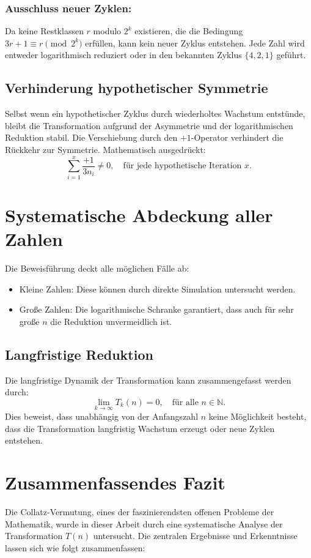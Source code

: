 \documentclass[a4paper,12pt]{article}
\begin{document}
\subsubsection{Ausschluss neuer Zyklen:}
   Da keine Restklassen \( r \) modulo \( 2^k \) existieren, die die Bedingung \( 3r + 1 \equiv r \pmod{2^k} \) erfüllen, kann kein neuer Zyklus entstehen. Jede Zahl wird entweder logarithmisch reduziert oder in den bekannten Zyklus \( \{4, 2, 1\} \) geführt.

\subsection{Verhinderung hypothetischer Symmetrie}
Selbst wenn ein hypothetischer Zyklus durch wiederholtes Wachstum entstünde, bleibt die Transformation aufgrund der Asymmetrie und der logarithmischen Reduktion stabil. Die Verschiebung durch den \(+1\)-Operator verhindert die Rückkehr zur Symmetrie. Mathematisch ausgedrückt:
\[
\sum_{i=1}^x \frac{+1}{3n_i} \neq 0, \quad \text{für jede hypothetische Iteration } x.
\]


\section{Systematische Abdeckung aller Zahlen}
Die Beweisführung deckt alle möglichen Fälle ab:
\begin{itemize}
    \item Kleine Zahlen: Diese können durch direkte Simulation untersucht werden.
    \item Große Zahlen: Die logarithmische Schranke garantiert, dass auch für sehr große \( n \) die Reduktion unvermeidlich ist.
\end{itemize}

\subsection{Langfristige Reduktion}
Die langfristige Dynamik der Transformation kann zusammengefasst werden durch:
\[
\lim_{k \to \infty} T_k(n) = 0, \quad \text{für alle } n \in \mathbb{N}.
\]
Dies beweist, dass unabhängig von der Anfangszahl \( n \) keine Möglichkeit besteht, dass die Transformation langfristig Wachstum erzeugt oder neue Zyklen entstehen.

\section{Zusammenfassendes Fazit}
Die Collatz-Vermutung, eines der faszinierendsten offenen Probleme der Mathematik, wurde in dieser Arbeit durch eine systematische Analyse der Transformation \( T(n) \) untersucht. Die zentralen Ergebnisse und Erkenntnisse lassen sich wie folgt zusammenfassen:
\end{document}
